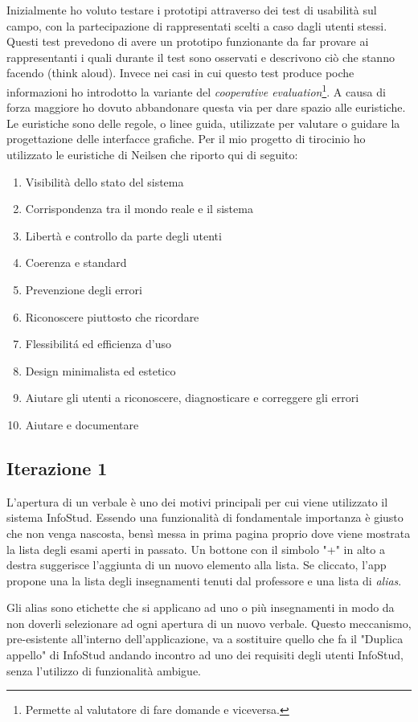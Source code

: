 \documentclass[Lau, oneside, noexaminfo]{sapthesis}%
\begin{document}
Inizialmente ho voluto testare i prototipi attraverso dei test di usabilità sul campo, con la partecipazione di rappresentati scelti a caso dagli utenti stessi. Questi test prevedono di avere un prototipo funzionante da far provare ai rappresentanti i quali durante il test sono osservati e descrivono ciò che stanno facendo (think aloud). Invece nei casi in cui questo test produce poche informazioni ho introdotto la variante del \textit{cooperative evaluation}\footnote{Permette al valutatore di fare domande e viceversa.}. A causa di forza maggiore ho dovuto abbandonare questa via per dare spazio alle euristiche. %
Le euristiche sono delle regole, o linee guida, utilizzate per valutare o guidare la progettazione delle interfacce grafiche. Per il mio progetto di tirocinio ho utilizzato le euristiche di Neilsen che riporto qui di seguito:
\begin{enumerate}
	\item Visibilità dello stato del sistema
	\item Corrispondenza tra il mondo reale e il sistema
	\item Libertà e controllo da parte degli utenti
	\item Coerenza e standard
	\item Prevenzione degli errori
	\item Riconoscere piuttosto che ricordare
	\item Flessibilit\'a ed efficienza d'uso 
	\item Design minimalista ed estetico
	\item Aiutare gli utenti a riconoscere, diagnosticare e correggere gli errori
	\item Aiutare e documentare
\end{enumerate}

\subsection{Iterazione 1}
L'apertura di un verbale è uno dei motivi principali per cui viene utilizzato il sistema InfoStud. Essendo una funzionalità di fondamentale importanza è giusto che non venga nascosta, bensì messa in prima pagina proprio dove viene mostrata la lista degli esami aperti in passato. Un bottone con il simbolo "+" in alto a destra suggerisce l'aggiunta di un nuovo elemento alla lista. Se cliccato, l'app propone una la lista degli insegnamenti tenuti dal professore e una lista di \textit{alias}. 

Gli alias sono etichette che si applicano ad uno o più insegnamenti in modo da non doverli selezionare ad ogni apertura di un nuovo verbale. Questo meccanismo, pre-esistente all'interno dell'applicazione, va a sostituire quello che fa il "Duplica appello" di InfoStud andando incontro ad uno dei requisiti degli utenti InfoStud, senza l'utilizzo di funzionalità ambigue.
\end{document}
